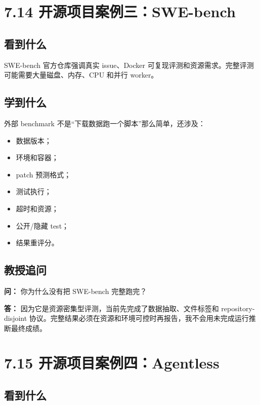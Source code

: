 \documentclass[UTF8,12pt,openany]{ctexbook}
\begin{document}
\section{7.14 开源项目案例三：SWE-bench}

\subsection{看到什么}

SWE-bench 官方仓库强调真实 issue、Docker 可复现评测和资源需求。完整评测可能需要大量磁盘、内存、CPU 和并行 worker。\par

\subsection{学到什么}

外部 benchmark 不是“下载数据跑一个脚本”那么简单，还涉及：\par

\begin{itemize}
\item 数据版本；
\item 环境和容器；
\item patch 预测格式；
\item 测试执行；
\item 超时和资源；
\item 公开/隐藏 test；
\item 结果重评分。
\end{itemize}

\subsection{教授追问}

\textbf{问：} 你为什么没有把 SWE-bench 完整跑完？\par

\textbf{答：} 因为它是资源密集型评测，当前先完成了数据抽取、文件标签和 repository-disjoint 协议。完整结果必须在资源和环境可控时再报告，我不会用未完成运行推断最终成绩。\par

\section{7.15 开源项目案例四：Agentless}

\subsection{看到什么}
\end{document}
